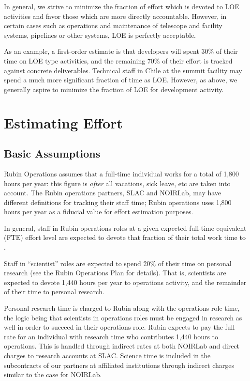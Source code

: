 In general, we strive to minimize the fraction of effort which is devoted to \gls{LOE} activities and favor those which are more directly accountable.
However, in certain cases such as operations and maintenance of telescope and facility systems, pipelines or other systems, \gls{LOE} is perfectly acceptable.

As an example, a first-order estimate is that developers will spent 30\% of their time on \gls{LOE} type activities, and the remaining 70\% of their effort is tracked against concrete deliverables.
Technical staff in Chile at the summit facility may spend a much more significant fraction of time as  \gls{LOE}.
However, as above, we generally aspire to minimize the fraction of \gls{LOE} for development activity.


\section{Estimating Effort}
\label{sec:effort}

\subsection{Basic Assumptions}
Rubin Operations assumes that a full-time individual works for a total of 1,800 hours per year: this figure is \emph{after} all vacations, sick leave, etc are taken into account.
The Rubin operations partners, SLAC and NOIRLab, may have different definitions for tracking their staff time; Rubin operations uses 1,800 hours per year as a fiducial value for effort estimation purposes.

In general, staff in Rubin operations roles at a given expected full-time equivalent (FTE) effort level are expected to devote that fraction of their total work time to \RO.

Staff in ``scientist'' roles are expected to spend 20\% of their time on personal research (see the Rubin Operations Plan for details).
That is, scientists are expected to devote 1,440 hours per
year to operations activity, and the remainder of their time to personal research.

Personal research time is charged to Rubin along with the operations role time, the logic being that
scientists in operations roles must be engaged in research as well in order to succeed in their operations role.
Rubin expects to pay the full rate for an individual with research time who contributes 1,440 hours to
operations.
This is handled through indirect rates at both NOIRLab and direct charges to research accounts at SLAC.
Science time is included in the subcontracts of our partners at affiliated institutions through indirect charges
similar to the case for NOIRLab.

